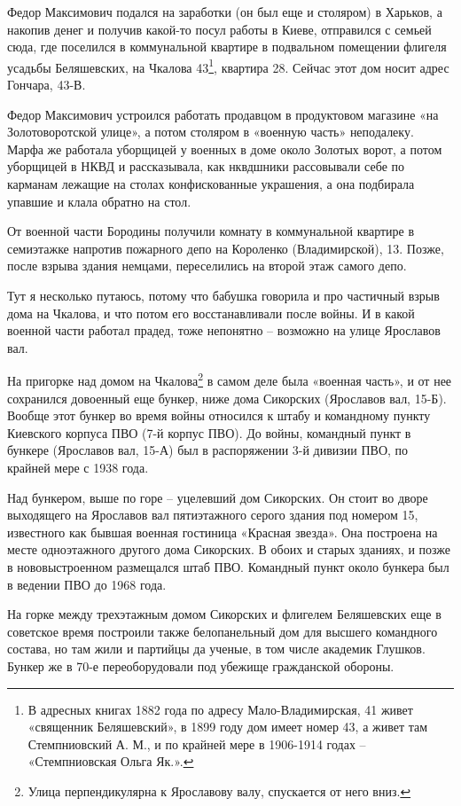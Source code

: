 Федор Максимович подался на заработки (он был еще и столяром) в Харьков, а накопив денег и получив какой-то посул работы в Киеве, отправился с семьей сюда, где поселился в коммунальной квартире в подвальном помещении флигеля усадьбы Беляшевских, на Чкалова 43\footnote{В адресных книгах 1882 года по адресу Мало-Владимирская, 41 живет «священник Беляшевский», в 1899 году дом имеет номер 43, а живет там Стемпниовский А. М., и по крайней мере в 1906-1914 годах – «Стемпниовская Ольга Як.».}, квартира 28. Сейчас этот дом носит адрес Гончара, 43-В.

Федор Максимович устроился работать продавцом в продуктовом магазине «на Золотоворотской улице», а потом столяром в «военную часть» неподалеку. Марфа же работала уборщицей у военных в доме около Золотых ворот, а потом уборщицей в НКВД и рассказывала, как нквдшники рассовывали себе по карманам лежащие на столах конфискованные украшения, а она подбирала упавшие и клала обратно на стол.

От военной части Бородины получили комнату в коммунальной квартире в семиэтажке напротив пожарного депо на Короленко (Владимирской), 13. Позже, после взрыва здания немцами, переселились на второй этаж самого депо.

Тут я несколько путаюсь, потому что бабушка говорила и про частичный взрыв дома на Чкалова, и что потом его восстанавливали после войны. И в какой военной части работал прадед, тоже непонятно – возможно на улице Ярославов вал.

На пригорке над домом на Чкалова\footnote{Улица перпендикулярна к Ярославову валу, спускается от него вниз.} в самом деле была «военная часть», и от нее сохранился довоенный еще бункер, ниже дома Сикорских (Ярославов вал, 15-Б). Вообще этот бункер во время войны относился к штабу и командному пункту Киевского корпуса ПВО (7-й корпус ПВО). До войны, командный пункт в бункере (Ярославов вал, 15-А) был в распоряжении 3-й дивизии ПВО, по крайней мере с 1938 года.

Над бункером, выше по горе – уцелевший дом Сикорских. Он стоит во дворе выходящего на Ярославов вал пятиэтажного серого здания под номером 15, известного как бывшая военная гостиница «Красная звезда». Она построена на месте одноэтажного другого дома Сикорских. В обоих и старых зданиях, и позже в нововыстроенном размещался штаб ПВО. Командный пункт около бункера был в ведении ПВО до 1968 года.

На горке между трехэтажным домом Сикорских и флигелем Беляшевских еще в советское время построили также белопанельный дом для высшего командного состава, но там жили и партийцы да ученые, в том числе академик Глушков. Бункер же в 70-е переоборудовали под убежище гражданской обороны.

